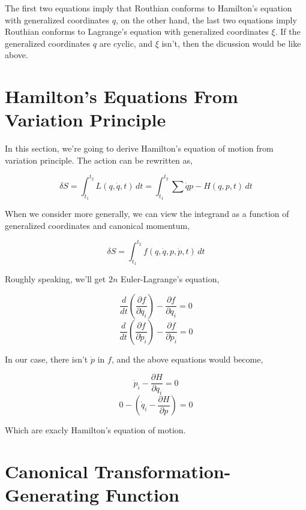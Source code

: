 \documentclass[12pt]{article}
\begin{document}
The first two equations imply that Routhian conforms to Hamilton's equation with generalized coordinates $q$, on the other hand, the last two equations imply Routhian conforms to Lagrange's equation with generalized coordinates $\xi$. If the generalized coordinates $q$ are cyclic, and $\xi$ isn't, then the dicussion would be like above.

\section{Hamilton's Equations From Variation Principle}

In this section, we're going to derive Hamilton's equation of motion from variation principle. The action can be rewritten as,

\begin{center}
    \[ \delta S = \int_{t_1}^{t_2}  L(q, \dot{q}, t) \,dt = \int_{t_1}^{t_2} \sum{\dot{q}p} - H(q, p, t) \,dt \]
\end{center}

When we consider more generally, we can view the integrand as a function of generalized coordinates and canonical momentum,

\begin{center}
    \[ \delta S = \int_{t_1}^{t_2} f(q, \dot{q}, p, \dot{p}, t) \,dt \]
\end{center}

Roughly speaking, we'll get $2n$ Euler-Lagrange's equation,

\begin{center}
    \[ \frac{d}{dt} \left(\frac{\partial f}{\partial \dot{q}_i}\right)  - \frac{\partial f}{\partial q_i} = 0 \]
    \[ \frac{d}{dt} \left(\frac{\partial f}{\partial \dot{p}_i}\right)  - \frac{\partial f}{\partial p_i} = 0 \]
\end{center}

In our case, there isn't $\dot{p}$ in $f$, and the above equations would become,

\begin{center}
    \[ \dot{p}_i - \frac{\partial H}{\partial q_i} = 0 \]
    \[ 0 - \left( \dot{q}_i - \frac{\partial H}{\partial p} \right) = 0 \]
\end{center}

Which are exacly Hamilton's equation of motion.

\section{Canonical Transformation-Generating Function}
\end{document}
